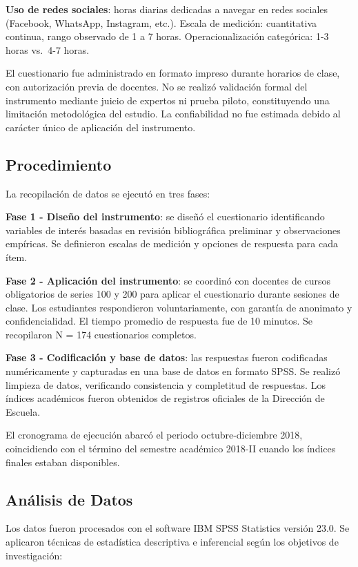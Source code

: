 \documentclass[
  stu,
  floatsintext,
  longtable,
  a4paper,
  nolmodern,
  notxfonts,
  notimes,
  12pt,
  colorlinks=true,linkcolor=blue,citecolor=blue,urlcolor=blue]{apa7}
\begin{document}
\textbf{Uso de redes sociales}: horas diarias dedicadas a navegar en
redes sociales (Facebook, WhatsApp, Instagram, etc.). Escala de
medición: cuantitativa continua, rango observado de 1 a 7 horas.
Operacionalización categórica: 1-3 horas vs.~4-7 horas.

El cuestionario fue administrado en formato impreso durante horarios de
clase, con autorización previa de docentes. No se realizó validación
formal del instrumento mediante juicio de expertos ni prueba piloto,
constituyendo una limitación metodológica del estudio. La confiabilidad
no fue estimada debido al carácter único de aplicación del instrumento.

\subsection{Procedimiento}\label{procedimiento}

La recopilación de datos se ejecutó en tres fases:

\textbf{Fase 1 - Diseño del instrumento}: se diseñó el cuestionario
identificando variables de interés basadas en revisión bibliográfica
preliminar y observaciones empíricas. Se definieron escalas de medición
y opciones de respuesta para cada ítem.

\textbf{Fase 2 - Aplicación del instrumento}: se coordinó con docentes
de cursos obligatorios de series 100 y 200 para aplicar el cuestionario
durante sesiones de clase. Los estudiantes respondieron voluntariamente,
con garantía de anonimato y confidencialidad. El tiempo promedio de
respuesta fue de 10 minutos. Se recopilaron N = 174 cuestionarios
completos.

\textbf{Fase 3 - Codificación y base de datos}: las respuestas fueron
codificadas numéricamente y capturadas en una base de datos en formato
SPSS. Se realizó limpieza de datos, verificando consistencia y
completitud de respuestas. Los índices académicos fueron obtenidos de
registros oficiales de la Dirección de Escuela.

El cronograma de ejecución abarcó el periodo octubre-diciembre 2018,
coincidiendo con el término del semestre académico 2018-II cuando los
índices finales estaban disponibles.

\subsection{Análisis de Datos}\label{anuxe1lisis-de-datos}

Los datos fueron procesados con el software IBM SPSS Statistics versión
23.0. Se aplicaron técnicas de estadística descriptiva e inferencial
según los objetivos de investigación:
\end{document}
